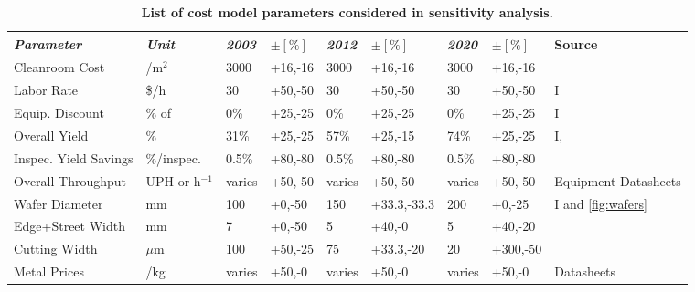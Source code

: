 \documentclass[parskip=full]{article}
\begin{document}
\begin{table}[]
\centering
\small
    \caption{\textbf{List of cost model parameters considered in sensitivity analysis.}}
    \begin{NiceTabularX}{1.1\textwidth}{ |X|X|l|l|l|l|l|l|X|}
        \hline
            \textit{Parameter} & \textit{Unit} & \textit{2003} & $\pm [\%]$ & \textit{2012} & $\pm [\%]$ & \textit{2020} & $\pm [\%]$ & Source \\
        \hline
            Cleanroom Cost & /m$^2$ & 3000 & +16,-16 & 3000 & +16,-16 & 3000 & +16,-16 & \cite{mddi1997cleanroom}\cite{ledcomv2} \newline \cite{bakshi2009euv}\cite{gajera2006process} \\
        \hline
            Labor Rate & \$/h & 30 & +50,-50 & 30 & +50,-50 & 30 & +50,-50 & I \\
        \hline
            Equip. Discount & \% of  & 0\% & +25,-25 & 0\% & +25,-25 & 0\% & +25,-25 & I \newline \cite{Appleyard_2001} \\
        \hline
            Overall Yield & \% & 31\% & +25,-25 & 57\% & +25,-15 & 74\% & +25,-25 & I, \cite{lumi2012yield}\cite{ledsmag2012} \newline \cite{systemplus2015reverse}\cite{ledcomv2} \\
        \hline
            Inspec. Yield Savings & \%/inspec. & 0.5\% & +80,-80 & 0.5\% & +80,-80 & 0.5\% & +80,-80 & \cite{mckinseyyield} \\
        \hline
            Overall Throughput & UPH or h$^{-1}$ & varies & +50,-50 & varies & +50,-50 & varies & +50,-50 & Equipment Datasheets \\
        \hline
            Wafer Diameter & mm & 100 & +0,-50 & 150 & +33.3,-33.3 & 200 & +0,-25 & I and \cref{fig:wafers} \\
        \hline
            Edge+Street Width & mm & 7 & +0,-50 & 5 & +40,-0 & 5 & +40,-20 & \cite{ledsmagexclusion}\cite{rubiconexclusion} \newline \cite{xiamenexclusion}\cite{american2007annual} \\
        \hline
            Cutting Width & $\mu$m & 100 & +50,-25 & 75 & +33.3,-20 & 20 & +300,-50 & \cite{masaki2000division}\cite{ils2005width} \newline \cite{photonics2010width}\cite{discowidth} \\
        \hline
            Metal Prices & /kg & varies & +50,-0 & varies & +50,-0 & varies & +50,-0 & Datasheets \\

\end{NiceTabularX}
\end{table}
\end{document}
